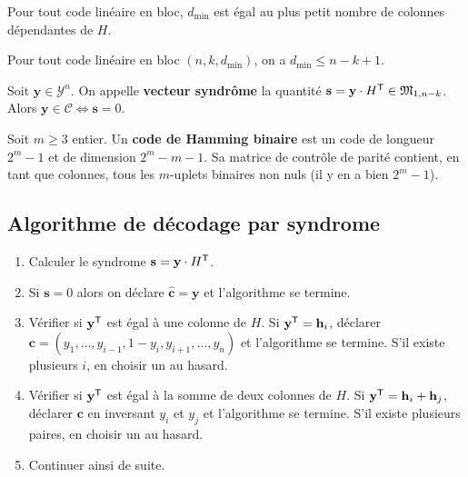 	\begin{thm}
		Pour tout code linéaire en bloc, $d_{\min}$ est égal au plus petit nombre de colonnes dépendantes de $H$.
	\end{thm}

	\begin{thm}
		Pour tout code linéaire en bloc $(n,k,d_{\min})$, on a $d_{\min} \leq n - k + 1$.
	\end{thm}

	\begin{defn}
		Soit $\mathbf{y} \in \mathcal{Y}^n$.
		On appelle \textbf{vecteur syndrôme} la quantité $\mathbf{s} = \mathbf{y} \cdot H^\mathsf{T} \in \mathfrak{M}_{1,n - k}$.
		Alors $\mathbf{y} \in \mathcal{C} \iff \mathbf{s} = 0$.
	\end{defn}

	\begin{defn}
		Soit $m \geq 3$ entier.
		Un \textbf{code de Hamming binaire} est un code de longueur $2^m - 1$ et de dimension $2^m - m - 1$.
		Sa matrice de contrôle de parité contient, en tant que colonnes, tous les $m$-uplets binaires non nuls (il y en a bien $2^m - 1$).
	\end{defn}


\subsection{Algorithme de décodage par syndrome}

	\begin{enumerate}
		\item Calculer le syndrome $\mathbf{s} = \mathbf{y} \cdot H^\mathsf{T}$.
		\item Si $\mathbf{s} = 0$ alors on déclare $\mathbf{\hat{c}} = \mathbf{y}$ et l'algorithme se termine.
		\item Vérifier si $\mathbf{y}^\mathsf{T}$ est égal à une colonne de $H$.
			Si $\mathbf{y}^\mathsf{T} = \mathbf{h}_i$, déclarer $\mathbf{c} = (y_1,\ldots,y_{i - 1},1 - y_i,y_{i + 1},\ldots,y_n)$ et l'algorithme se termine.
			S'il existe plusieurs $i$, en choisir un au hasard.
		\item Vérifier si $\mathbf{y}^\mathsf{T}$ est égal à la somme de deux colonnes de $H$.
			Si $\mathbf{y}^\mathsf{T} = \mathbf{h}_i + \mathbf{h}_j$, déclarer $\mathbf{c}$ en inversant $y_i$ et $y_j$ et l'algorithme se termine.
				S'il existe plusieurs paires, en choisir un au hasard.
		\item Continuer ainsi de suite.
	\end{enumerate}

